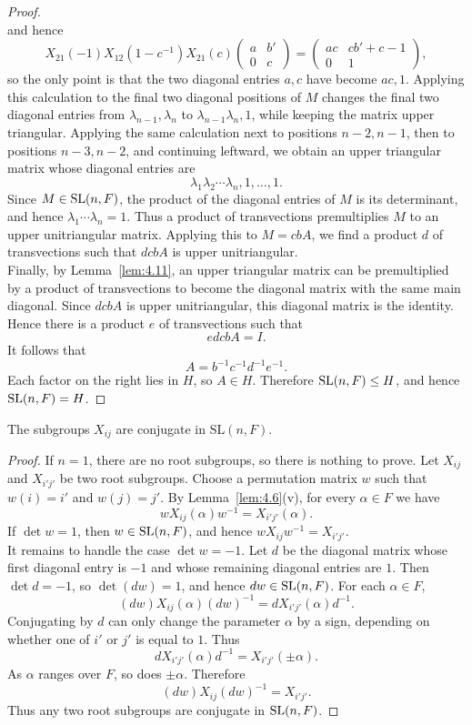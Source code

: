 \documentclass[../Odyssey_Project.tex]{subfiles}
\begin{document}
\begin{proof}
\[\]
and hence
\[
    X_{21}(-1)X_{12}(1-c^{-1})X_{21}(c)
    \begin{pmatrix}
        a & b'\\
        0 & c
    \end{pmatrix}
    =
    \begin{pmatrix}
        ac & cb'+c-1\\
        0  & 1
    \end{pmatrix},
\]
so the only point is that the two diagonal entries $a,c$ have become $ac,1$. Applying this calculation to the final two diagonal positions of $M$ changes the final two diagonal entries from $\lambda_{n-1},\lambda_n$ to $\lambda_{n-1}\lambda_n,1$, while keeping the matrix upper triangular. Applying the same calculation next to positions $n-2,n-1$, then to positions $n-3,n-2$, and continuing leftward, we obtain an upper triangular matrix whose diagonal entries are
\[
    \lambda_1\lambda_2\cdots\lambda_n,1,\ldots,1.
\]
Since $M\in \operatorname{SL}(n,F)$, the product of the diagonal entries of $M$ is its determinant, and hence $\lambda_1\cdots\lambda_n=1$. Thus a product of transvections premultiplies $M$ to an upper unitriangular matrix. Applying this to $M=cbA$, we find a product $d$ of transvections such that $dcbA$ is upper unitriangular.\\
Finally, by Lemma~\ref{lem:4.11}, an upper triangular matrix can be premultiplied by a product of transvections to become the diagonal matrix with the same main diagonal. Since $dcbA$ is upper unitriangular, this diagonal matrix is the identity. Hence there is a product $e$ of transvections such that
\[
    edcbA=I.
\]
It follows that
\[
    A=b^{-1}c^{-1}d^{-1}e^{-1}.
\]
Each factor on the right lies in $H$, so $A\in H$. Therefore $\operatorname{SL}(n,F)\leq H$, and hence $\operatorname{SL}(n,F)=H$.
\end{proof}

\begin{proposition}
\label{prop:6.3}
The subgroups $X_{ij}$ are conjugate in $\mathrm{SL}(n,F)$.
\end{proposition}
\begin{proof}
If $n=1$, there are no root subgroups, so there is nothing to prove. Let $X_{ij}$ and $X_{i'j'}$ be two root subgroups. Choose a permutation matrix $w$ such that $w(i)=i'$ and $w(j)=j'$. By Lemma~\ref{lem:4.6}(v), for every $\alpha\in F$ we have
\[
    wX_{ij}(\alpha)w^{-1}=X_{i'j'}(\alpha).
\]
If $\det w=1$, then $w\in \operatorname{SL}(n,F)$, and hence $wX_{ij}w^{-1}=X_{i'j'}$.\\
It remains to handle the case $\det w=-1$. Let $d$ be the diagonal matrix whose first diagonal entry is $-1$ and whose remaining diagonal entries are $1$. Then $\det d=-1$, so $\det(dw)=1$, and hence $dw\in \operatorname{SL}(n,F)$. For each $\alpha\in F$,
\[
    (dw)X_{ij}(\alpha)(dw)^{-1}
    =dX_{i'j'}(\alpha)d^{-1}.
\]
Conjugating by $d$ can only change the parameter $\alpha$ by a sign, depending on whether one of $i'$ or $j'$ is equal to $1$. Thus
\[
    dX_{i'j'}(\alpha)d^{-1}=X_{i'j'}(\pm\alpha).
\]
As $\alpha$ ranges over $F$, so does $\pm\alpha$. Therefore
\[
    (dw)X_{ij}(dw)^{-1}=X_{i'j'}.
\]
Thus any two root subgroups are conjugate in $\operatorname{SL}(n,F)$.
\end{proof}
\end{document}
